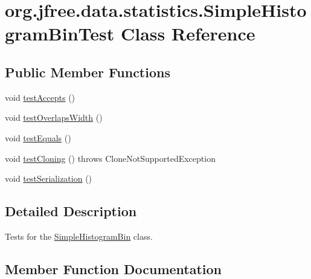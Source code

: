 \hypertarget{classorg_1_1jfree_1_1data_1_1statistics_1_1_simple_histogram_bin_test}{}\section{org.\+jfree.\+data.\+statistics.\+Simple\+Histogram\+Bin\+Test Class Reference}
\label{classorg_1_1jfree_1_1data_1_1statistics_1_1_simple_histogram_bin_test}
\subsection*{Public Member Functions}
\begin{DoxyCompactItemize}
\item 
void \mbox{\hyperlink{classorg_1_1jfree_1_1data_1_1statistics_1_1_simple_histogram_bin_test_a06af10977b0301b26b1bc747a61032fe}{test\+Accepts}} ()
\item 
void \mbox{\hyperlink{classorg_1_1jfree_1_1data_1_1statistics_1_1_simple_histogram_bin_test_a22921caed49a1442ff9a0a618fa2efdf}{test\+Overlaps\+Width}} ()
\item 
void \mbox{\hyperlink{classorg_1_1jfree_1_1data_1_1statistics_1_1_simple_histogram_bin_test_a5cad8cbfacf29d4628c291305d733de8}{test\+Equals}} ()
\item 
void \mbox{\hyperlink{classorg_1_1jfree_1_1data_1_1statistics_1_1_simple_histogram_bin_test_a17e13a423f1d8c87223706c08869f62d}{test\+Cloning}} ()  throws Clone\+Not\+Supported\+Exception 
\item 
void \mbox{\hyperlink{classorg_1_1jfree_1_1data_1_1statistics_1_1_simple_histogram_bin_test_a247639ce817f8d9585529108a0652e06}{test\+Serialization}} ()
\end{DoxyCompactItemize}


\subsection{Detailed Description}
Tests for the \mbox{\hyperlink{classorg_1_1jfree_1_1data_1_1statistics_1_1_simple_histogram_bin}{Simple\+Histogram\+Bin}} class. 

\subsection{Member Function Documentation}
\mbox{\label{classorg_1_1jfree_1_1data_1_1statistics_1_1_simple_histogram_bin_test_a06af10977b0301b26b1bc747a61032fe}} 
